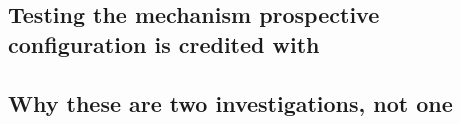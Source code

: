 \subsection{Testing the mechanism prospective configuration is credited with}
\label{sec:r3}

%

\begin{figure}[t]\centering
  \begin{panelbox}
  \end{panelbox}
  \caption{\label{fig:915}}
\end{figure}

\begin{figure}[t]\centering
  \begin{panelbox}
    \par\vspace{6pt}
  \end{panelbox}
  \caption{\label{fig:916}}
\end{figure}

\subsection{Why these are two investigations, not one}
\label{sec:r4}

